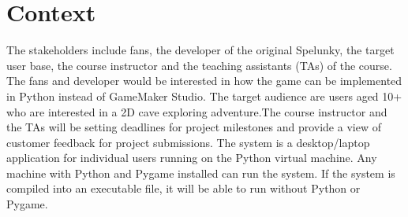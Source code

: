 \documentclass{article}
\begin{document}
\section{Context}
\indent \indent The stakeholders include fans, the developer of the original Spelunky, the target user base, the course instructor and the teaching assistants (TAs) of the course. The fans and developer would be interested in how the game can be implemented in Python instead of GameMaker Studio. The target audience are users aged 10+ who are interested in a 2D cave exploring adventure.The course instructor and the TAs will be setting deadlines for project milestones and provide a view of customer feedback for project submissions. The system is a desktop/laptop application for individual users running on the Python virtual machine. Any machine with Python and Pygame installed can run the system.
If the system is compiled into an executable file, it will be able to run without Python or Pygame.
\end{document}
